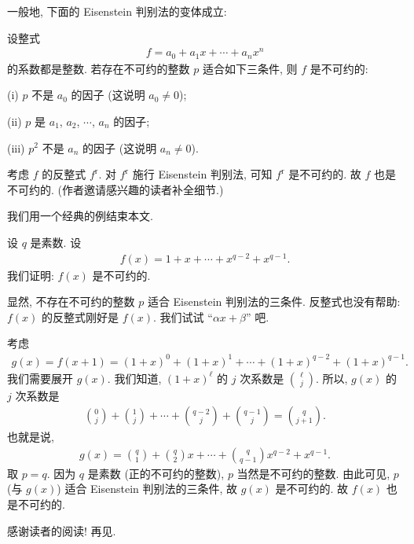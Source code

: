 一般地, 下面的 Eisenstein 判别法的变体成立:

\begin{proposition}
    设整式
    \begin{align*}
        f = a_0 + a_1 x + \cdots + a_n x^n
    \end{align*}
    的系数都是整数. 若存在不可约的整数 $p$ 适合如下三条件, 则 $f$ 是不可约的:

    (i) $p$ 不是 $a_0$ 的因子 (这说明 $a_0 \neq 0$);

    (ii) $p$ 是 $a_1$, $a_2$, $\cdots$, $a_n$ 的因子;

    (iii) $p^2$ 不是 $a_n$ 的因子 (这说明 $a_n \neq 0$).
\end{proposition}

\begin{pf}
    考虑 $f$ 的反整式 $f^{\mathrm{r}}$. 对 $f^{\mathrm{r}}$ 施行 Eisenstein 判别法, 可知 $f^{\mathrm{r}}$ 是不可约的. 故 $f$ 也是不可约的. (作者邀请感兴趣的读者补全细节.)
\end{pf}

我们用一个经典的例结束本文.

\begin{example}
    设 $q$ 是素数. 设
    \begin{align*}
        f(x) = 1 + x + \cdots + x^{q-2} + x^{q-1}.
    \end{align*}
    我们证明: $f(x)$ 是不可约的.

    显然, 不存在不可约的整数 $p$ 适合 Eisenstein 判别法的三条件. 反整式也没有帮助: $f(x)$ 的反整式刚好是 $f(x)$. 我们试试 ``$\alpha x + \beta$'' 吧.

    考虑
    \begin{align*}
        g(x) = f(x + 1) = (1 + x)^0 + (1 + x)^1 + \cdots + (1 + x)^{q - 2} + (1 + x)^{q - 1}.
    \end{align*}
    我们需要展开 $g(x)$. 我们知道, $(1 + x)^\ell$ 的 $j$ 次系数是 $\binom{\ell}{j}$. 所以, $g(x)$ 的 $j$ 次系数是
    \begin{align*}
        \binom{0}{j} + \binom{1}{j} + \cdots + \binom{q-2}{j} + \binom{q-1}{j} = \binom{q}{j + 1}.
    \end{align*}
    也就是说,
    \begin{align*}
        g(x) = \binom{q}{1} + \binom{q}{2} x + \cdots + \binom{q}{q - 1} x^{q-2} + x^{q-1}.
    \end{align*}
    取 $p = q$. 因为 $q$ 是素数 (正的不可约的整数), $p$ 当然是不可约的整数. 由此可见, $p$ (与 $g(x)$) 适合 Eisenstein 判别法的三条件, 故 $g(x)$ 是不可约的. 故 $f(x)$ 也是不可约的.
\end{example}

感谢读者的阅读! 再见.
